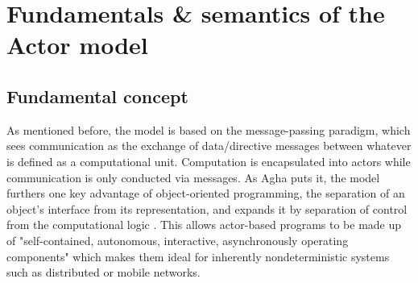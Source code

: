 \documentclass[A4]{article}
\begin{document}
\section{Fundamentals \& semantics of the Actor model}
\subsection{Fundamental concept}
As mentioned before, the model is based on the message-passing paradigm, which sees communication as the exchange of data/directive messages between whatever is defined as a computational unit. Computation is encapsulated into actors while communication is only conducted via messages. As Agha puts it, the model furthers one key advantage of object-oriented programming, the separation of an object's interface from its representation, and expands it by separation of control from the computational logic \cite{reference/parallel/KarmaniA11}. This allows actor-based programs to be made up of "self-contained, autonomous, interactive, asynchronously operating components" \cite[p.~1]{reference/parallel/KarmaniA11} which makes them ideal for inherently nondeterministic systems such as distributed or mobile networks. 
\end{document}
